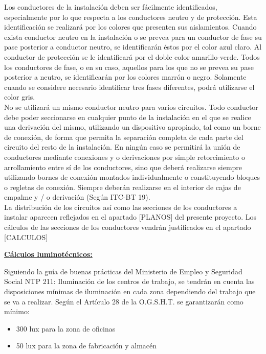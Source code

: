 Los conductores de la instalación deben ser fácilmente identificados, especialmente por lo que respecta a los conductores neutro y de protección. Esta identificación se realizará por los colores que presenten sus aislamientos. Cuando exista conductor neutro en la instalación o se prevea para un conductor de fase su pase posterior a conductor neutro, se identificarán éstos por el color azul claro. Al conductor de protección se le identificará por el doble color amarillo-verde. Todos los conductores de fase, o en su caso, aquellos para los que no se prevea su pase posterior a neutro, se identificarán por los colores marrón o negro. Solamente cuando se considere necesario identificar tres fases diferentes, podrá utilizarse el color gris.\\

No se utilizará un mismo conductor neutro para varios circuitos. Todo conductor debe poder seccionarse en cualquier punto de la instalación en el que se realice una derivación del mismo, utilizando un dispositivo apropiado, tal como un borne de conexión, de forma que permita la separación completa de cada parte del circuito del resto de la instalación. En ningún caso se permitirá la unión de conductores mediante conexiones y o derivaciones por simple retorcimiento o arrollamiento entre sí de los conductores, sino que deberá realizarse siempre utilizando bornes de conexión montados individualmente o constituyendo bloques o regletas de conexión. Siempre deberán realizarse en el interior de cajas de empalme y / o derivación (Según ITC-BT 19).\\

La distribución de los circuitos así como las secciones de los conductores a instalar aparecen reflejados en el apartado [PLANOS] del presente proyecto. Los cálculos de las secciones de los conductores vendrán justificados en el apartado [CALCULOS]\pagebreak

\underline{\bfseries Cálculos luminotécnicos:}

Siguiendo la guía de buenas prácticas del Ministerio de Empleo y Seguridad Social NTP 211: Iluminación de los centros de trabajo, se tendrán en cuenta las disposiciones mínimas de iluminación en cada zona dependiendo del trabajo que se va a realizar. Según el Artículo 28 de la O.G.S.H.T. se garantizarán como mínimo:

\begin{itemize}

\item 300 lux para la zona de oficinas 

\item 50 lux para la zona de fabricación y almacén

\end{itemize}

